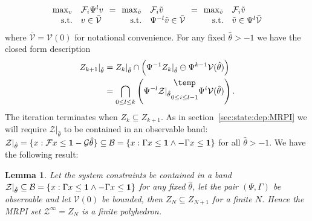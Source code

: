 \documentclass[letterpaper, 10pt, conference]{ieeeconf} %
\newtheorem{thm}{Lemma}[section]
\newcommand{\bigominus}{\raisebox{10pt}{$\temp$}}
\begin{document}
\[
\begin{array}{@{}rl@{\hspace{0.7em}}c@{\hspace{0.7em}}rl@{\hspace{0.7em}}c@{\hspace{0.7em}}rl@{}}
\max_v&\mathcal F_i \Psi^l v &=& \max_{\tilde v}&\mathcal F_i \tilde  v &=& \max_{\tilde v}&\mathcal F_i \tilde v \\ 
\text{s.t.}&v\in\bar{\mathcal{V}} & & \text{s.t.}&\Psi^{-l} \tilde v\in\bar{\mathcal{V}} & &
\text{s.t.}& \tilde v\in\Psi^l\bar{\mathcal{V}}
\end{array}
\]
%
where $\bar{\mathcal{V}}=\mathcal V(0)$ for notational convenience. For any fixed $\hat\theta>-1$
we have the closed form description
%
\begin{equation}\label{eq:closed:form:parametrised:iterates}
\begin{split}
	Z_{k+1}\vert_{\hat\theta} &= Z_{k}\vert_{\hat\theta}\cap\left(
	\Psi^{-1}Z_k\vert_{\hat\theta}\ominus\Psi^{k-1}\mathcal V(\hat\theta)\right)\\
	&=\bigcap_{0\leq l\leq k}\left(\Psi^{-l}\mathcal Z\vert_{\hat\theta}\underset{0\leq i\leq l-1}{\bigominus} 
	\Psi^i \mathcal V(\hat\theta)
	\right).
\end{split}
\end{equation}
%
The iteration terminates when $Z_k\subseteq Z_{k+1}$. As in section~\ref{sec:state:dep:MRPI}
we will require $\mathcal Z\vert_{\hat\theta}$ to be contained in an observable band: $\mathcal Z\vert_{\hat\theta}
=\{x:\mathcal Fx \leq {\bf{1}}-\mathcal G\hat\theta\}\subseteq \mathcal B=\{x:\Gamma x\leq {\bf{1}}\wedge -\Gamma 
x\leq {\bf{1}}\}$ for all $\hat\theta>-1$. We have the following result:
%
\begin{thm}
Let the system constraints be contained in a band $\mathcal Z\vert_{\hat\theta}\subseteq\mathcal 
B=\{x:\Gamma x\leq {\bf{1}}\wedge -\Gamma x\leq {\bf{1}}\}$ for any fixed $\hat\theta$, let the
pair $(\Psi,\Gamma)$ be observable and let $\mathcal V(0)$ be bounded, then $Z_N\subseteq Z_{N+1}$
for a finite $N$. Hence the MRPI set $\mathcal Z^\infty = Z_N$ is a finite polyhedron.
\end{thm}
%
\end{document}
